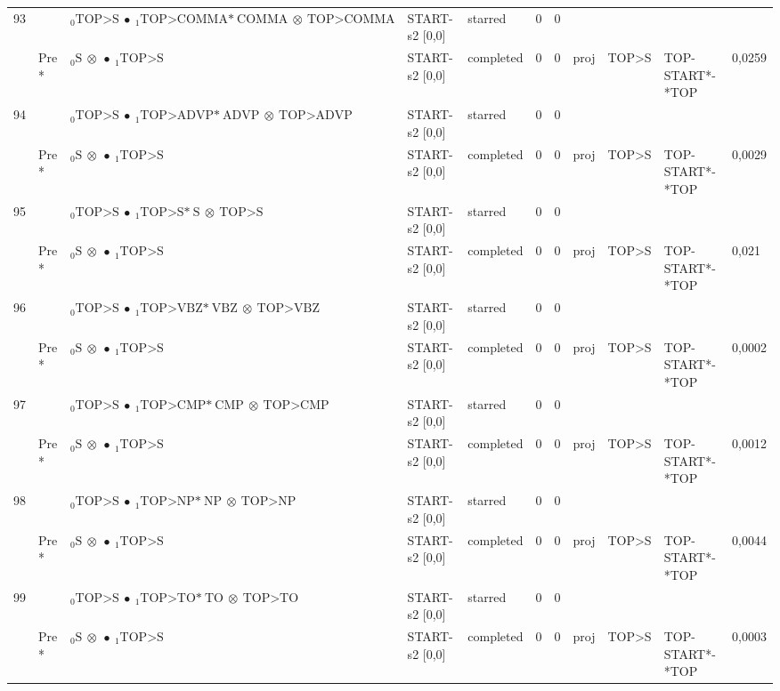 \documentclass[10pt]{article}
\begin{document}
\begin{longtable}[htbp]{lllllllllll}
93 & & $ {}_0 \textrm{TOP>S} \  \bullet \ {}_{1} \textrm{TOP>COMMA*} \ \textrm{COMMA} \  \otimes \ \textrm{TOP>COMMA} $ & START-s2 [0,0] & starred & 0 & 0 & & & & \\ 
 & Pre *& $ {}_0 \textrm{S} \  \otimes \  \bullet \ {}_{1} \textrm{TOP>S} $ & START-s2 [0,0] & completed & 0 & 0 & proj & TOP>S & TOP-START*-*TOP & 0,0259 \\ 
94 & & $ {}_0 \textrm{TOP>S} \  \bullet \ {}_{1} \textrm{TOP>ADVP*} \ \textrm{ADVP} \  \otimes \ \textrm{TOP>ADVP} $ & START-s2 [0,0] & starred & 0 & 0 & & & & \\ 
 & Pre *& $ {}_0 \textrm{S} \  \otimes \  \bullet \ {}_{1} \textrm{TOP>S} $ & START-s2 [0,0] & completed & 0 & 0 & proj & TOP>S & TOP-START*-*TOP & 0,0029 \\ 
95 & & $ {}_0 \textrm{TOP>S} \  \bullet \ {}_{1} \textrm{TOP>S*} \ \textrm{S} \  \otimes \ \textrm{TOP>S} $ & START-s2 [0,0] & starred & 0 & 0 & & & & \\ 
 & Pre *& $ {}_0 \textrm{S} \  \otimes \  \bullet \ {}_{1} \textrm{TOP>S} $ & START-s2 [0,0] & completed & 0 & 0 & proj & TOP>S & TOP-START*-*TOP & 0,021 \\ 
96 & & $ {}_0 \textrm{TOP>S} \  \bullet \ {}_{1} \textrm{TOP>VBZ*} \ \textrm{VBZ} \  \otimes \ \textrm{TOP>VBZ} $ & START-s2 [0,0] & starred & 0 & 0 & & & & \\ 
 & Pre *& $ {}_0 \textrm{S} \  \otimes \  \bullet \ {}_{1} \textrm{TOP>S} $ & START-s2 [0,0] & completed & 0 & 0 & proj & TOP>S & TOP-START*-*TOP & 0,0002 \\ 
97 & & $ {}_0 \textrm{TOP>S} \  \bullet \ {}_{1} \textrm{TOP>CMP*} \ \textrm{CMP} \  \otimes \ \textrm{TOP>CMP} $ & START-s2 [0,0] & starred & 0 & 0 & & & & \\ 
 & Pre *& $ {}_0 \textrm{S} \  \otimes \  \bullet \ {}_{1} \textrm{TOP>S} $ & START-s2 [0,0] & completed & 0 & 0 & proj & TOP>S & TOP-START*-*TOP & 0,0012 \\ 
98 & & $ {}_0 \textrm{TOP>S} \  \bullet \ {}_{1} \textrm{TOP>NP*} \ \textrm{NP} \  \otimes \ \textrm{TOP>NP} $ & START-s2 [0,0] & starred & 0 & 0 & & & & \\ 
 & Pre *& $ {}_0 \textrm{S} \  \otimes \  \bullet \ {}_{1} \textrm{TOP>S} $ & START-s2 [0,0] & completed & 0 & 0 & proj & TOP>S & TOP-START*-*TOP & 0,0044 \\ 
99 & & $ {}_0 \textrm{TOP>S} \  \bullet \ {}_{1} \textrm{TOP>TO*} \ \textrm{TO} \  \otimes \ \textrm{TOP>TO} $ & START-s2 [0,0] & starred & 0 & 0 & & & & \\ 
 & Pre *& $ {}_0 \textrm{S} \  \otimes \  \bullet \ {}_{1} \textrm{TOP>S} $ & START-s2 [0,0] & completed & 0 & 0 & proj & TOP>S & TOP-START*-*TOP & 0,0003 \\ 

\end{longtable}
\end{document}
